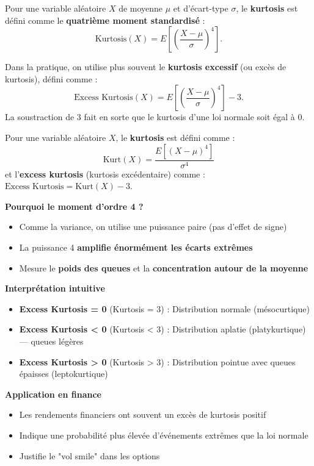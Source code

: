 \begin{definitionbox}
Pour une variable aléatoire $X$ de moyenne $\mu$ et d'écart-type $\sigma$, le \textbf{kurtosis} est défini comme le \textbf{quatrième moment standardisé} :
$$ \text{Kurtosis}(X) = E\left[ \left( \frac{X - \mu}{\sigma} \right)^4 \right]. $$

Dans la pratique, on utilise plus souvent le \textbf{kurtosis excessif} (ou excès de kurtosis), défini comme :
$$ \text{Excess Kurtosis}(X) = E\left[ \left( \frac{X - \mu}{\sigma} \right)^4 \right] - 3. $$
La soustraction de 3 fait en sorte que le kurtosis d'une loi normale soit égal à 0.
\end{definitionbox}

\begin{intuitionbox}
Pour une variable aléatoire $X$, le \textbf{kurtosis} est défini comme :
\[
\text{Kurt}(X) = \frac{E[(X - \mu)^4]}{\sigma^4}
\]
et l'\textbf{excess kurtosis} (kurtosis excédentaire) comme : $\text{Excess Kurtosis} = \text{Kurt}(X) - 3$.

\medskip

\textbf{Pourquoi le moment d'ordre 4 ?}
\begin{itemize}
    \item Comme la variance, on utilise une puissance paire (pas d'effet de signe)
    \item La puissance 4 \textbf{amplifie énormément les écarts extrêmes}
    \item Mesure le \textbf{poids des queues} et la \textbf{concentration autour de la moyenne}
\end{itemize}

\medskip

\textbf{Interprétation intuitive}
\begin{itemize}
    \item \textbf{Excess Kurtosis = 0} (Kurtosis = 3) : Distribution normale (mésocurtique)
    \item \textbf{Excess Kurtosis < 0} (Kurtosis < 3) : Distribution aplatie (platykurtique) — queues légères
    \item \textbf{Excess Kurtosis > 0} (Kurtosis > 3) : Distribution pointue avec queues épaisses (leptokurtique)
\end{itemize}

\medskip

\textbf{Application en finance}
\begin{itemize}
    \item Les rendements financiers ont souvent un excès de kurtosis positif
    \item Indique une probabilité plus élevée d'événements extrêmes que la loi normale
    \item Justifie le "vol smile" dans les options
\end{itemize}


\end{intuitionbox}
